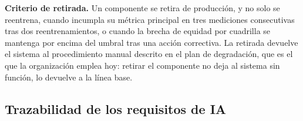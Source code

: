 \noindent
\textbf{Criterio de retirada.} Un componente se retira de producción, y no solo se reentrena, cuando
incumpla su métrica principal en tres mediciones consecutivas tras dos reentrenamientos, o cuando la
brecha de equidad por cuadrilla se mantenga por encima del umbral tras una acción correctiva. La
retirada devuelve el sistema al procedimiento manual descrito en el plan de degradación, que es el
que la organización emplea hoy: retirar el componente no deja al sistema sin función, lo devuelve a
la línea base.

\subsection{Trazabilidad de los requisitos de IA}
\label{sec:trazabilidad-ia}

